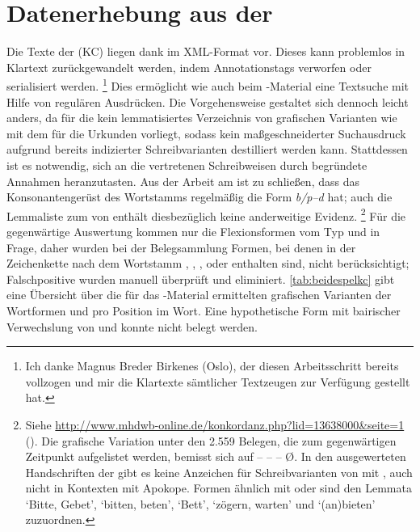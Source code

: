 
\section{Datenerhebung aus der }

Die Texte der \KC{} (KC) liegen dank 
\autocite{kcdigital} im XML-Format vor. Dieses kann problemlos in Klartext
zurückgewandelt werden, indem Annotationstags verworfen oder serialisiert
werden.%
%
	\footnote{Ich danke Magnus Breder Birkenes (Oslo), der diesen Arbeitsschritt
	bereits vollzogen und mir die Klartexte sämtlicher Textzeugen zur Verfügung
	gestellt hat.}
%
Dies ermöglicht wie auch beim \CAO{}-Material eine Textsuche mit Hilfe
von regulären Ausdrücken. Die Vorgehensweise gestaltet sich dennoch leicht
anders, da für die \KC{} kein lemmatisiertes Verzeichnis von grafischen
Varianten wie mit dem \WMU{} für die Urkunden vorliegt, sodass kein
maßgeschneiderter Suchausdruck aufgrund bereits indizierter Schreibvarianten
destilliert werden kann. Stattdessen ist es notwendig, sich an die vertretenen
Schreibweisen durch begründete Annahmen heranzutasten. Aus der Arbeit am
\CAO{} ist zu schließen, dass das Konsonantengerüst des Wortstamms
regelmäßig die Form \textit{b/p--d} hat; auch die Lemmaliste zum
 von \citeauthor{mwb1}
\autocite[\pno~]{mwb1} enthält diesbezüglich keine anderweitige
Evidenz.%
%
	\footnote{Siehe
		\url{http://www.mhdwb-online.de/konkordanz.php?lid=13638000&seite=1}
		(). Die grafische Variation unter den 2.559 Belegen,
		die zum gegenwärtigen Zeitpunkt aufgelistet werden, bemisst sich auf
		 --  --  --
		 Ø. In den
		ausgewerteten Handschriften der \KC{} gibt es keine Anzeichen für
		Schreibvarianten von  mit , auch nicht in
		Kontexten mit Apokope. Formen ähnlich  mit  oder
		 sind den Lemmata  `Bitte, Gebet',
		 `bitten, beten',  `Bett',
		 `zögern, warten' und  `(an)bieten'
		zuzuordnen.}
%
Für die gegenwärtige Auswertung kommen nur die Flexionsformen vom Typ 
und  in Frage, daher wurden bei der Belegsammlung Formen, bei denen
in der Zeichenkette nach dem Wortstamm , , , 
oder  enthalten sind, nicht berücksichtigt; Falschpositive wurden
manuell überprüft und eliminiert. \cref{tab:beidespelkc} gibt eine Übersicht
über die für das \KC{}-Material ermittelten grafischen Varianten der
Wortformen  und  pro Position im Wort. Eine
hypothetische Form  mit bairischer Verwechslung von  und
 \autocite[153]{paul2007} konnte nicht belegt werden.

